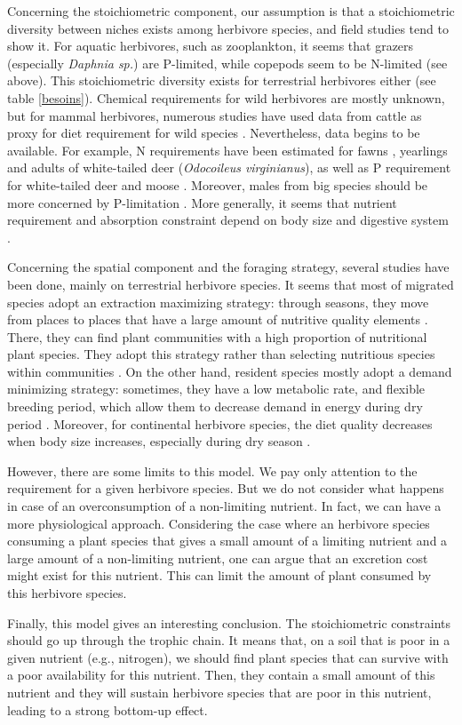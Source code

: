 \documentclass[12pt]{article}
\begin{document}
Concerning the stoichiometric component, our assumption is that a stoichiometric diversity between niches exists among herbivore species, and field studies tend to show it. For aquatic herbivores, such as zooplankton, it seems that grazers (especially \textit{Daphnia sp.}) are P-limited, while copepods seem to be N-limited (see above). This stoichiometric diversity exists for terrestrial herbivores either (see table \ref{besoins}). Chemical requirements %
for wild herbivores are mostly unknown, but for mammal herbivores, numerous studies have used data from cattle as proxy for diet requirement for wild species \citep{Voeten1999}. Nevertheless, data begins to be available. For example,  N requirements have been estimated for fawns \citep{Smith1975}, yearlings \citep{Holter1979} and adults \citep{Asleson1996} of white-tailed deer (\textit{Odocoileus virginianus}), as well as P requirement for white-tailed deer \citep{Grasman1993} and moose \citep{Schwartz1987}. Moreover, males from big species should be more concerned by P-limitation \citep{Grasman1993}. More generally, it seems that nutrient requirement and absorption constraint depend on body size and digestive system \citep{Janis1976}. \par 
Concerning the spatial component and the foraging strategy, several studies have been done, mainly on terrestrial herbivore species. It seems that most of  migrated species adopt an extraction maximizing strategy: through seasons, they move from places to places that have a large amount of nutritive quality elements \citep{Albon1992}. 
There, they can find plant communities with a high proportion of nutritional plant species. They adopt this strategy rather than selecting nutritious species within communities \citep{Ben-Shahar1992}.
On the other hand, resident species mostly adopt a demand minimizing strategy: sometimes, they have a low metabolic rate, and flexible breeding period, which allow them to decrease demand in energy during dry period \citep{Murray1991}. Moreover, for continental herbivore species, the diet quality decreases when body size increases, especially during dry season \citep{Codron2007}. 
\par

However, there are some limits to this model. We pay only attention to the requirement for a given herbivore species. But we do not consider what happens in case of an overconsumption of a non-limiting nutrient. In fact, we can have a more physiological approach. Considering the case where an herbivore species consuming a plant species that gives a small amount of a limiting nutrient and a large amount of a non-limiting nutrient, one can argue that an excretion cost might exist  for this nutrient. This can limit the amount of plant consumed by this herbivore species.\par 
Finally, this model gives an interesting conclusion. The stoichiometric constraints should go up through the trophic chain. It means that, on a soil that is poor in a given nutrient (e.g., nitrogen), we should find plant species that can survive with a poor availability  for this nutrient. Then, they contain a small amount of this nutrient and they will sustain herbivore species that are poor in this nutrient, leading to a strong bottom-up effect. 
\end{document}
